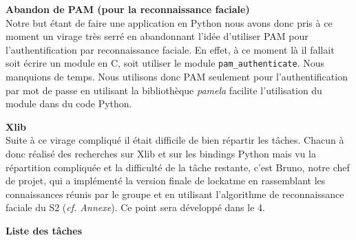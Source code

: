 \documentclass[french]{report}
\begin{document}
  \newpage

  \textbf{Abandon de PAM (pour la reconnaissance faciale)}\\

  Notre but étant de faire une application en Python nous avons donc pris à ce
  moment un virage très serré en abandonnant l’idée d’utiliser PAM pour l'authentification
  par reconnaissance faciale. En effet, à ce moment là il fallait soit écrire un
  module en C, soit utiliser le module \texttt{pam\_authenticate}. Nous
  manquions de temps. Nous utilisons donc PAM seulement pour l'authentification par
  mot de passe en utilisant la bibliothèque \emph{pamela} facilite l'utilisation
  du module dans du code Python.

  \vspace{0.5cm}

  \textbf{Xlib}\\

  Suite à ce virage compliqué il était difficile de bien répartir les tâches.
  Chacun à donc réalisé des recherches sur Xlib et sur les bindings Python mais vu la
  répartition compliquée et la difficulté de la tâche restante, c’est
  Bruno, notre chef de projet, qui a implémenté la version finale de lockatme en
  rassemblant les connaissances réunis par le groupe et en utilisant
  l’algorithme de reconnaissance faciale du S2 (\emph{cf. Annexe}).
  Ce point sera développé dans le 4.

  \vspace{0.5cm}

\newpage

\textbf{Liste des tâches}\\
\end{document}
